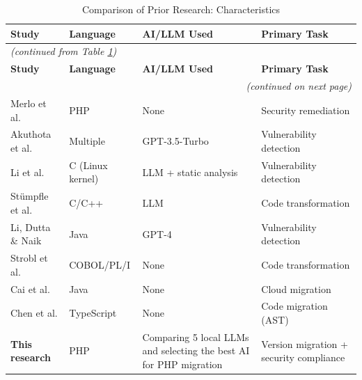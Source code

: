 \begin{longtable}{|l|p{3cm}|p{3cm}|p{3cm}|}
\caption{Comparison of Prior Research: Characteristics}
\label{tab:perbandingan-1} \\
\hline
\textbf{Study} & \textbf{Language} & \textbf{AI/LLM Used} & \textbf{Primary Task} \\
\hline \hline
\endfirsthead
\multicolumn{4}{l}{\textit{(continued from Table \ref{tab:perbandingan-1})}} \\
\hline
\textbf{Study} & \textbf{Language} & \textbf{AI/LLM Used} & \textbf{Primary Task} \\
\hline \hline
\endhead
\hline
\multicolumn{4}{r}{\textit{(continued on next page)}} \\
\endfoot
\hline
\endlastfoot
Merlo et al. \cite{merlo2007automated} & PHP & None & Security remediation \\
\hline
Akuthota et al. \cite{akuthota2023vulnerability} & Multiple & GPT-3.5-Turbo & Vulnerability detection \\
\hline
Li et al. \cite{li2025software} & C (Linux kernel) & LLM + static analysis & Vulnerability detection \\
\hline
Stümpfle et al. \cite{stumpfle2025llm} & C/C++ & LLM & Code transformation \\
\hline
Li, Dutta \& Naik \cite{li2025iris} & Java & GPT-4 & Vulnerability detection \\
\hline
Strobl et al. \cite{strobl2020automated} & COBOL/PL/I & None & Code transformation \\
\hline
Cai et al. \cite{cai2015pattern} & Java & None & Cloud migration \\
\hline
Chen et al. \cite{chen2022ast} & TypeScript & None & Code migration (AST) \\
\hline
\textbf{This research} & PHP & Comparing 5 local LLMs and selecting the best AI for PHP migration & Version migration + security compliance \\
\hline
\end{longtable}

